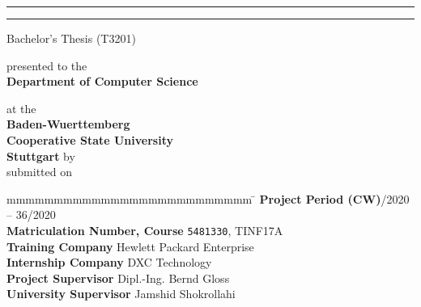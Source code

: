 \hfill
{}

\vfill\vfill

\begin{center}
	\rule{\linewidth}{1pt}
	{
		\Huge \bfseries
			\@title
		\par	
	}
	\vspace{-0.2cm}
	\rule{\linewidth}{1pt}
	

	Bachelor's Thesis (T3201)
	\vfill
	
	presented to the \\ \textbf{Department of Computer Science}
	
	at the \\ \textbf{Baden-Wuerttemberg \\Cooperative State University\\Stuttgart}
	\vfill
	by \\ \textbf{\textsc{\@author}}
	\vfill \vfill
	submitted on \\ \textbf{\@date}
\end{center}

\vfill\vfill

\begin{tabbing}
	mmmmmmmmmmmmmmmmmmmmmmmmmm				\= \kill
	\textbf{Project Period (CW)}/2020 -- 36/2020 \\
	\textbf{Matriculation Number, Course} \> \texttt{5481330}, TINF17A \\
	\textbf{Training Company} \> Hewlett Packard Enterprise \\
	\textbf{Internship Company} \> DXC Technology \\
	\textbf{Project Supervisor} \> Dipl.-Ing. Bernd Gloss \\
	\textbf{University Supervisor} \> Jamshid Shokrollahi
\end{tabbing}